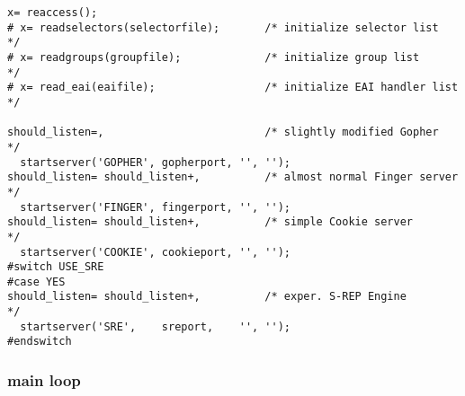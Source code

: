 \begin{verbatim}
x= reaccess();
# x= readselectors(selectorfile);       /* initialize selector list      */
# x= readgroups(groupfile);             /* initialize group list         */
# x= read_eai(eaifile);                 /* initialize EAI handler list   */

should_listen=,                         /* slightly modified Gopher      */
  startserver('GOPHER', gopherport, '', '');
should_listen= should_listen+,          /* almost normal Finger server   */
  startserver('FINGER', fingerport, '', '');
should_listen= should_listen+,          /* simple Cookie server          */
  startserver('COOKIE', cookieport, '', '');
#switch USE_SRE
#case YES
should_listen= should_listen+,          /* exper. S-REP Engine           */
  startserver('SRE',    sreport,    '', '');
#endswitch 
\end{verbatim}

\subsubsection{main loop}

\def\LPtopF{main loop}

